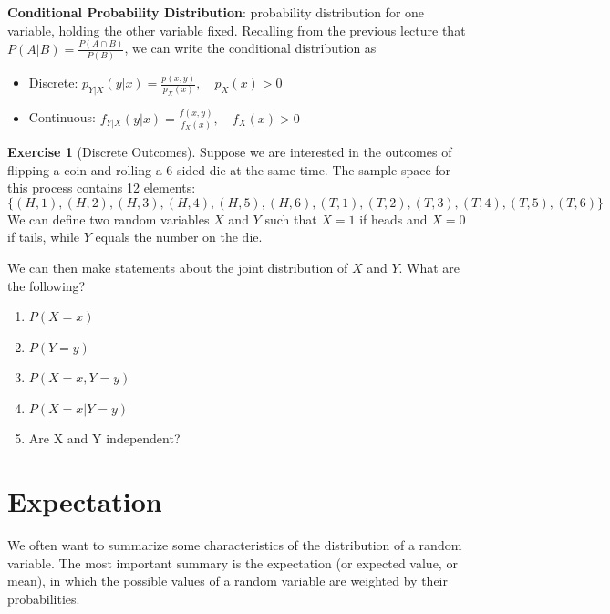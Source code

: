 \documentclass[
]{book}
\providecommand{\tightlist}{%
  \setlength{\itemsep}{0pt}\setlength{\parskip}{0pt}}
\theoremstyle{definition}
\theoremstyle{definition}
\theoremstyle{definition}
\newtheorem{exercise}{Exercise}[chapter]
\theoremstyle{remark}
\begin{document}
\textbf{Conditional Probability Distribution}: probability distribution for one variable, holding the other variable fixed. Recalling from the previous lecture that \(P(A|B)=\frac{P(A\cap B)}{P(B)}\), we can write the conditional distribution as

\begin{itemize}
\tightlist
\item
  Discrete: \(p_{Y|X}(y|x) = \frac{p(x,y)}{p_X(x)}, \quad p_X(x) > 0\)
\item
  Continuous: \(f_{Y|X}(y|x) = \frac{f(x,y)}{f_X(x)},\quad f_X(x) > 0\)
\end{itemize}

\begin{exercise}[Discrete Outcomes]
\protect\hypertarget{exr:unnamed-chunk-82}{}{\label{exr:unnamed-chunk-82} {} }Suppose we are interested in the outcomes of flipping a coin and rolling a 6-sided die at the same time. The sample space for this process contains 12 elements: \[\{(H, 1), (H, 2), (H, 3), (H, 4), (H, 5), (H, 6), (T, 1), (T, 2), (T, 3), (T, 4), (T, 5), (T, 6)\}\] We can define two random variables \(X\) and \(Y\) such that \(X = 1\) if heads and \(X = 0\) if tails, while \(Y\) equals the number on the die.

We can then make statements about the joint distribution of \(X\) and \(Y\). What are the following?

\begin{enumerate}
\def\labelenumi{\arabic{enumi}.}
\tightlist
\item
  \(P(X=x)\)
\item
  \(P(Y=y)\)
\item
  \(P(X=x, Y=y)\)
\item
  \(P(X=x|Y=y)\)
\item
  Are X and Y independent?
\end{enumerate}
\end{exercise}

\hypertarget{expectation}{%
\section{Expectation}\label{expectation}}

We often want to summarize some characteristics of the distribution of a random variable. The most important summary is the expectation (or expected value, or mean), in which the possible values of a random variable are weighted by their probabilities.
\end{document}
